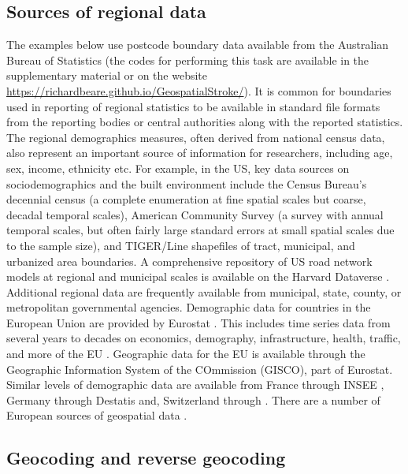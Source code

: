 \documentclass[utf8]{frontiersHLTH}
\begin{document}
\subsection{Sources of regional data}\label{sources-of-regional-data} 

The examples below use postcode boundary data available from the
Australian Bureau of Statistics (the codes for performing this task
are available in the supplementary material or on the website
\href{https://richardbeare.github.io/GeospatialStroke/}{https://richardbeare.github.io/GeospatialStroke/}). It
is common for boundaries used in reporting of regional statistics to
be available in standard file formats from the reporting bodies or
central authorities along with the reported statistics. The regional
demographics measures, often derived from national census data, also
represent an important source of information for researchers,
including age, sex, income, ethnicity etc. For example, in the US, key
data sources on sociodemographics and the built environment include
the Census Bureau's decennial census \cite{us_census_bureau_decennial}
(a complete enumeration at fine spatial scales but coarse, decadal
temporal scales), American Community Survey\cite{us_census_bureau_acs}
(a survey with annual temporal scales, but often fairly large standard
errors at small spatial scales due to the sample size), and TIGER/Line
shapefiles\cite{us_census_tiger_line} of tract, municipal, and
urbanized area boundaries. A comprehensive repository of US road
network models at regional and municipal scales is available on the
Harvard Dataverse \cite{boeing_street_2019}. Additional regional data
are frequently available from municipal, state, county, or
metropolitan governmental agencies. Demographic data for countries in
the European Union are provided by Eurostat \cite{eurostat}. This
includes time series data from several years to decades on economics,
demography, infrastructure, health, traffic, and more of the EU
\cite{Lahti2017}. Geographic data for the EU is available through the
Geographic Information System of the COmmission (GISCO), part of
Eurostat. Similar levels of demographic data are available from France
through INSEE \cite{insee}, Germany through Destatis \cite{destatis}
and, Switzerland through \cite{swiss-bfs}. There are a number of
European sources of geospatial data \cite{diva-gis,germany-gis,swiss-3d}.

\subsection{Geocoding and reverse geocoding}\label{geocoding-and-reverse-geocoding} 
\end{document}

